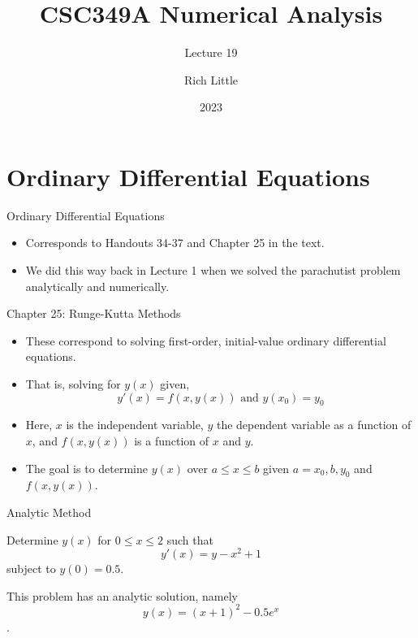 \documentclass[12pt]{beamer}
\title[CSC349A Numerical Analysis]{CSC349A Numerical Analysis}
\subtitle[Lecture 19]{Lecture 19}
\date[2023]{2023}
\author[R. Little]{Rich Little}
\institute[University of Victoria]{University of Victoria}
\begin{document}
\frame{\maketitle} %



\section{Ordinary Differential Equations}

\begin{frame}{Ordinary Differential Equations}

\begin{itemize}
\item{Corresponds to Handouts 34-37 and Chapter 25 in the text.}
\item{We did this way back in Lecture 1 when we solved the parachutist problem analytically and numerically.}
\end{itemize}

\end{frame}

\begin{frame}{Chapter 25: Runge-Kutta Methods}

\begin{itemize}
\item{These correspond to solving first-order, initial-value ordinary differential equations.}
\item{That is, solving for $y(x)$ given,
\[
y'(x)=f(x,y(x)) \text{ and } y(x_0) = y_0
\]}
\item{Here, $x$ is the independent variable, $y$ the dependent variable as a function of $x$, and $f(x,y(x))$ is a function of $x$ and $y$.}
\item{The goal is to determine $y(x)$ over $a \leq x \leq b$ given $a=x_0,b,y_0$ and $f(x,y(x))$.}
\end{itemize}

\end{frame}

\begin{frame}{Analytic Method}

Determine $y(x)$ for $0 \leq x \leq 2$ such that
\[
y'(x) = y - x^2 + 1
\]
subject to $y(0) = 0.5$.

\vspace{\baselineskip}
This problem has an analytic solution, namely \[y(x) = (x+1)^2 - 0.5e^x\].

\end{frame}
\end{document}
